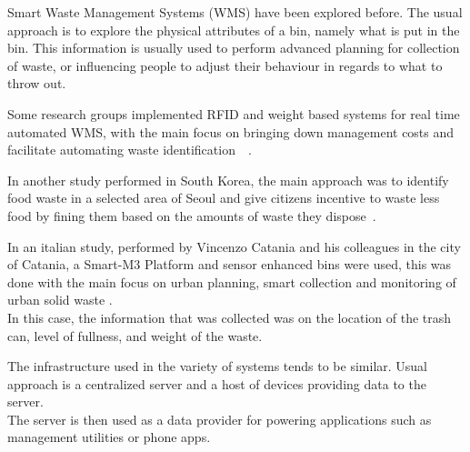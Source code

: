 Smart Waste Management Systems (WMS) have been explored before. The usual approach is to explore the physical attributes of a bin, namely what is put in the bin.
This information is usually used to perform advanced planning for collection of waste, or influencing people to adjust their behaviour in regards to what to throw out.

Some research groups implemented RFID and weight  based systems for real time automated WMS, with the main focus on bringing down management costs and facilitate automating waste identification~\cite{france}~\cite{australia}.

In another study performed in South Korea, the main approach was to identify food waste in a selected area of Seoul and give citizens incentive to waste less food by fining them based on the amounts of waste they dispose~\cite{korea}.

In an italian study, performed by Vincenzo Catania and his colleagues in the city of Catania, a Smart-M3 Platform and sensor enhanced bins were used, this was done with the main focus on urban planning, smart collection and  monitoring of urban solid waste \cite{catania}.\\
In this case, the information that was collected was on the location of the trash can, level of fullness, and weight of the waste.

The infrastructure used in the variety of systems tends to be similar.
Usual approach is a centralized server and a host of devices providing data to the server.\\
The server is then used as a data provider for powering applications such as management utilities or phone apps.
